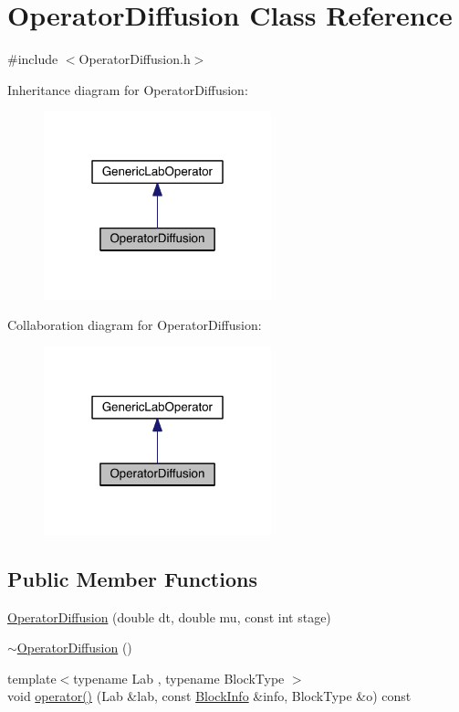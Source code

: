 \hypertarget{class_operator_diffusion}{}\section{Operator\+Diffusion Class Reference}
\label{class_operator_diffusion}


{\ttfamily \#include $<$Operator\+Diffusion.\+h$>$}



Inheritance diagram for Operator\+Diffusion\+:\nopagebreak
\begin{figure}[H]
\begin{center}
\leavevmode
\includegraphics[width=187pt]{de/d0e/class_operator_diffusion__inherit__graph}
\end{center}
\end{figure}


Collaboration diagram for Operator\+Diffusion\+:\nopagebreak
\begin{figure}[H]
\begin{center}
\leavevmode
\includegraphics[width=187pt]{d0/d16/class_operator_diffusion__coll__graph}
\end{center}
\end{figure}
\subsection*{Public Member Functions}
\begin{DoxyCompactItemize}
\item 
\hyperlink{class_operator_diffusion_a3cc566079ed936df04daadaf9f0cd70a}{Operator\+Diffusion} (double dt, double mu, const int stage)
\item 
\hyperlink{class_operator_diffusion_a32224246dc49919bb24dbb9798492c7d}{$\sim$\+Operator\+Diffusion} ()
\item 
{\footnotesize template$<$typename Lab , typename Block\+Type $>$ }\\void \hyperlink{class_operator_diffusion_a38cb92587b86ed70af0ea263e35fec0b}{operator()} (Lab \&lab, const \hyperlink{struct_block_info}{Block\+Info} \&info, Block\+Type \&o) const 
\end{DoxyCompactItemize}
